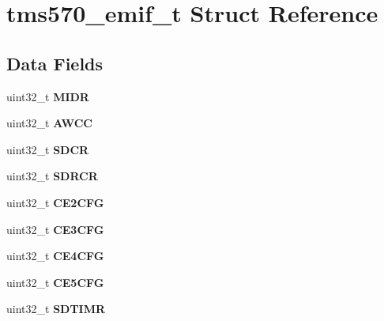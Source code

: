\hypertarget{structtms570__emif__t}{}\section{tms570\+\_\+emif\+\_\+t Struct Reference}
\label{structtms570__emif__t}
\subsection*{Data Fields}
\begin{DoxyCompactItemize}
\item 
\mbox{\label{structtms570__emif__t_afa06c8091530b8be3c8b7f86f93dd881}} 
uint32\+\_\+t {\bfseries M\+I\+DR}
\item 
\mbox{\label{structtms570__emif__t_ae022cc5c6c4d253cc5facc09bdb22a31}} 
uint32\+\_\+t {\bfseries A\+W\+CC}
\item 
\mbox{\label{structtms570__emif__t_af1c5c75d4d18f909747961aa8a30b656}} 
uint32\+\_\+t {\bfseries S\+D\+CR}
\item 
\mbox{\label{structtms570__emif__t_a250926be9b5728032c7f09673ac5b357}} 
uint32\+\_\+t {\bfseries S\+D\+R\+CR}
\item 
\mbox{\label{structtms570__emif__t_a72f75b4257f69066477a6ebf6950a94d}} 
uint32\+\_\+t {\bfseries C\+E2\+C\+FG}
\item 
\mbox{\label{structtms570__emif__t_a321d3b66c6886add030ed5c967a1abe2}} 
uint32\+\_\+t {\bfseries C\+E3\+C\+FG}
\item 
\mbox{\label{structtms570__emif__t_a25fed5cb3e5434b30a7b59593e7464d8}} 
uint32\+\_\+t {\bfseries C\+E4\+C\+FG}
\item 
\mbox{\label{structtms570__emif__t_a466680b867fbb8dfe78a04e730b24a3e}} 
uint32\+\_\+t {\bfseries C\+E5\+C\+FG}
\item 
\mbox{\label{structtms570__emif__t_a08124717a54be8ebde562863f4d4148d}} 
uint32\+\_\+t {\bfseries S\+D\+T\+I\+MR}

\end{DoxyCompactItemize}
